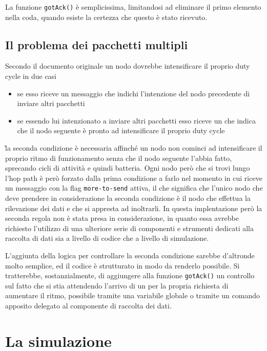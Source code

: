 \documentclass[twoside,11pt,a4paper,italian,openany]{book}
\begin{document}
La funzione \texttt{gotAck()} è semplicissima, limitandosi ad eliminare il primo elemento 
nella coda, quando esiste la certezza che questo è stato ricevuto. 

\subsection{Il problema dei pacchetti multipli}
Secondo il documento originale un nodo dovrebbe intensificare il proprio duty cycle in due casi
\begin{itemize}
\item{se esso riceve un messaggio che indichi l'intenzione del nodo precedente di inviare altri 
pacchetti}
\item{se essendo lui intenzionato a inviare altri pacchetti esso riceve un \ack che indica che il nodo seguente è pronto ad intensificare il proprio duty cycle}
\end{itemize}
\`la seconda condizione è necessaria affinché un nodo non cominci ad intensificare il proprio 
ritmo di funzionamento senza che il nodo seguente l'abbia fatto, sprecando cicli di attività e 
quindi batteria. Ogni nodo però che si trovi lungo l'hop path è però forzato dalla prima 
condizione a farlo nel momento in cui riceve un messaggio con la flag \texttt{more-to-send} 
attiva, il che significa che l'unico nodo che deve prendere in considerazione la seconda 
condizione è il nodo che effettua la rilevazione dei dati e che si appresta ad inoltrarli. 
In questa implentazione però la seconda regola non è stata presa in considerazione, in quanto 
essa avrebbe richiesto l'utilizzo di una ulteriore serie di componenti e strumenti dedicati alla 
raccolta di dati sia a livello di codice che a livello di simulazione.

L'aggiunta della logica per controllare la seconda condizione sarebbe d'altronde molto semplice, ed il codice è strutturato in modo da renderlo possibile.
Si tratterebbe, sostanzialmente, di aggiungere alla funzione \texttt{gotAck()} un controllo sul 
fatto che si stia attendendo l'arrivo di un \ack per la propria richiesta di aumentare il ritmo,
possibile tramite una variabile globale o tramite un comando apposito delegato al componente di 
raccolta dei dati.  
 

\section{La simulazione}


\appendix
\lstset{
  basicstyle=\small,
  numbers=left, 
  stepnumber=5, 
  numbersep=8pt,
  frame=L,
  }
\end{document}
